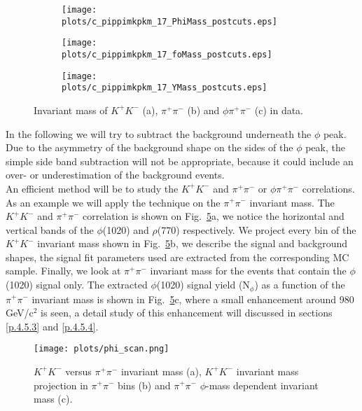\begin{figure}[H]
    \centering
    \begin{subfigure}[b]{0.45\textwidth}
        \texttt{[image: plots/c\_pippimkpkm\_17\_PhiMass\_postcuts.eps]}
        \caption{}
        \label{fig.4.4.1.a}
    \end{subfigure}
    \begin{subfigure}[b]{0.45\textwidth}
        \texttt{[image: plots/c\_pippimkpkm\_17\_foMass\_postcuts.eps]}
        \caption{}
        \label{fig.4.4.1.b}
    \end{subfigure}
    \begin{subfigure}[b]{0.45\textwidth}
        \texttt{[image: plots/c\_pippimkpkm\_17\_YMass\_postcuts.eps]}
        \caption{}
        \label{fig.4.4.1.c}
    \end{subfigure}
    \caption{Invariant mass of $K^+K^-$ (a), $\pi^+\pi^-$ (b) and $\phi \pi^+ \pi^-$ (c) in data.}
    \label{fig:4.4.1}
\end{figure}

\par In the following we will try to subtract the background underneath the $\phi$ peak. Due to the asymmetry of the background shape on the sides of the $\phi$ peak, the simple side band subtraction will not be appropriate, because it could include an over- or underestimation of the background events.\\
An efficient method will be to study the $K^+K^-$ and $\pi^+\pi^-$ or $\phi \pi^+ \pi^-$ correlations. As an example we will apply the technique on the $\pi^+\pi^-$ invariant mass. The $K^+K^-$ and $\pi^+\pi^-$ correlation is shown on Fig.~\ref{fig.4.4.2}a, we notice the horizontal and vertical bands of the $\phi$(1020) and $\rho$(770) respectively. We project every bin of the $K^+K^-$ invariant mass shown in Fig.~\ref{fig.4.4.2}b, we describe the signal and background shapes, the signal fit parameters used are extracted from the corresponding MC sample. Finally, we look at $\pi^+\pi^-$ invariant mass for the events that contain the $\phi$(1020) signal only. The extracted $\phi$(1020) signal yield (N$_{\phi}$) as a function of the $\pi^+\pi^-$ invariant mass is shown in Fig.~\ref{fig.4.4.2}c, where a small enhancement around 980 GeV/c$^2$ is seen, a detail study of this enhancement will discussed in sections \ref{p.4.5.3} and \ref{p.4.5.4}.

\begin{figure}[H]
    \centering
    \texttt{[image: plots/phi\_scan.png]}
    \caption{\label{fig.4.4.2}$K^+K^-$ versus $\pi^+\pi^-$ invariant mass (a), $K^+K^-$ invariant mass projection in $\pi^+\pi^-$ bins (b) and $\pi^+\pi^-$ $\phi$-mass dependent invariant mass (c).}
\end{figure}

